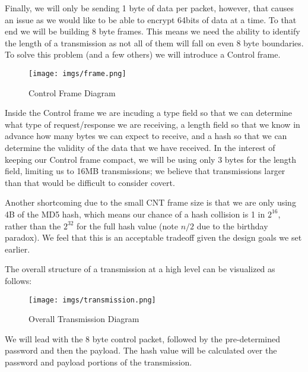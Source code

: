 \documentclass[titlepage]{article}
\begin{document}
Finally, we will only be sending 1 byte of data per packet, however, that causes an issue as we would like to be able to encrypt 64bits of data at a time. To that end
we will be building 8 byte frames. This means we need the ability to identify the length of a transmission as not all of them will fall on even 8 byte boundaries.  To solve this problem
(and a few others) we will introduce a Control frame.

\clearpage

\begin{figure}[htb]                                                                       
  \begin{center}
    \texttt{[image: imgs/frame.png]}
  \end{center}
  \caption{Control Frame Diagram}
  \label{fig:frame}
\end{figure}

Inside the Control frame we are incuding a type field so that we can determine what type of request/response we are receiving, a length field so that we know in advance how
many bytes we can expect to receive, and a hash so that we can determine the validity of the data that we have received. In the interest of keeping our Control frame compact,
we will be using only 3 bytes for the length field, limiting us to 16MB transmissions; we believe that transmissions larger than that would be difficult to consider covert. 

Another shortcoming due to the small CNT frame size is that we are only using 4B of the MD5 hash, which means our chance of a hash collision is 1 in $2^{16}$, rather than the $2^{32}$
for the full hash value (note $n/2$ due to the birthday paradox). We feel that this is an acceptable tradeoff given the design goals we set earlier.

The overall structure of a transmission at a high level can be visualized as follows:

\clearpage

\begin{figure}[htb]                                                                       
  \begin{center}
    \texttt{[image: imgs/transmission.png]}
  \end{center}
  \caption{Overall Transmission Diagram}
  \label{fig:transmission}
\end{figure}

We will lead with the 8 byte control packet, followed by the pre-determined password and then the payload. The hash value will be calculated over the password and payload
portions of the transmission.
\end{document}
